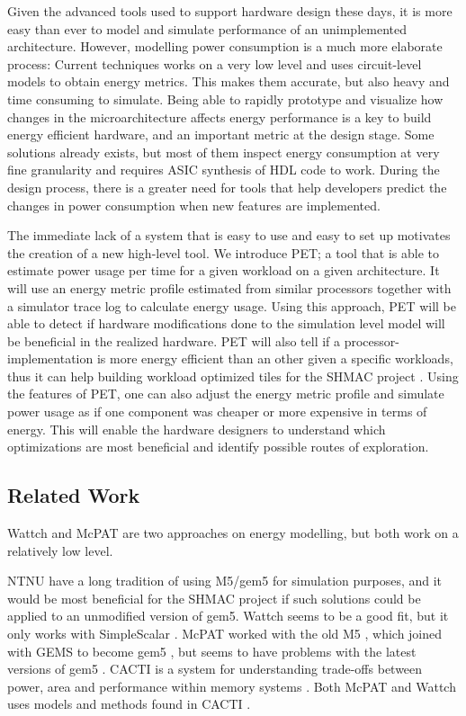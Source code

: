 Given the advanced tools used to support hardware design these days, it is more
easy than ever to model and simulate performance of an unimplemented
architecture. However, modelling power consumption is a much more elaborate
process: Current techniques works on a very low level and uses circuit-level
models to obtain energy metrics. This makes them accurate, but also heavy and
time consuming to simulate. Being able to rapidly prototype and visualize how
changes in the microarchitecture affects energy performance is a key to build
energy efficient hardware, and an important metric at the design stage. Some
solutions already exists, but most of them inspect energy consumption at very
fine granularity and requires ASIC synthesis of HDL code to work. During the
design process, there is a greater need for tools that help developers predict
the changes in power consumption when new features are implemented.

The immediate lack of a system that is easy to use and easy to set up motivates
the creation of a new high-level tool. We introduce PET; a tool that is able to
estimate power usage per time for a given workload on a given architecture. It
will use an energy metric profile estimated from similar processors together
with a simulator trace log to calculate energy usage. Using this approach, PET
will be able to detect if hardware modifications done to the simulation level
model will be beneficial in the realized hardware. PET will also tell if a
processor-implementation is more energy efficient than an other given a specific
workloads, thus it can help building workload optimized tiles for the SHMAC
project \cite{shmacwebpage}. Using the features of PET, one can also adjust the
energy metric profile and simulate power usage as if one component was cheaper
or more expensive in terms of energy. This will enable the hardware designers to
understand which optimizations are most beneficial and identify possible routes
of exploration.


\subsection{Related Work}

Wattch \cite{brooks2000wattch} and McPAT \cite{hpmcpat,li2013mcpat} are two
approaches on energy modelling, but both work on a relatively low level.

NTNU have a long tradition of using M5/gem5 for simulation purposes, and it
would be most beneficial for the SHMAC project if such solutions could be
applied to an unmodified version of gem5. Wattch seems to be a good fit, but it
only works with SimpleScalar \cite{wattchanalysis}. McPAT worked with the old M5
\cite{m5mcpatparser}, which joined with GEMS to become gem5 \cite{gem5hipeac},
but seems to have problems with the latest versions of gem5
\cite{mcpatgem5problems}. CACTI is a system for understanding trade-offs between
power, area and performance within memory systems
\cite{hpcacti,muralimanohar2010memory}. Both McPAT and Wattch uses models and
methods found in CACTI \cite{li2009mcpat}.

